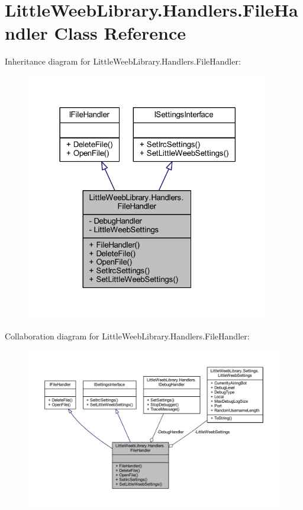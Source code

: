 \hypertarget{class_little_weeb_library_1_1_handlers_1_1_file_handler}{}\section{Little\+Weeb\+Library.\+Handlers.\+File\+Handler Class Reference}
\label{class_little_weeb_library_1_1_handlers_1_1_file_handler}


Inheritance diagram for Little\+Weeb\+Library.\+Handlers.\+File\+Handler\+:\nopagebreak
\begin{figure}[H]
\begin{center}
\leavevmode
\includegraphics[width=302pt]{class_little_weeb_library_1_1_handlers_1_1_file_handler__inherit__graph}
\end{center}
\end{figure}


Collaboration diagram for Little\+Weeb\+Library.\+Handlers.\+File\+Handler\+:\nopagebreak
\begin{figure}[H]
\begin{center}
\leavevmode
\includegraphics[width=350pt]{class_little_weeb_library_1_1_handlers_1_1_file_handler__coll__graph}
\end{center}
\end{figure}
